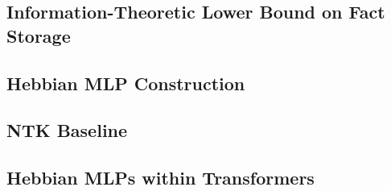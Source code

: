 \subsection{Information-Theoretic Lower Bound on Fact Storage}
\label{sec:info_theory_bound}
\label{app:theory:preliminaries}


\subsection{Hebbian MLP Construction}
\label{app:theory:hebbian_mlps}


\subsection{NTK Baseline}
\label{app:theory:hebbian_mlps:ntk_construction}




\newpage

\subsection{Hebbian MLPs within Transformers}
\label{app:theory:transformers_perturbation}

